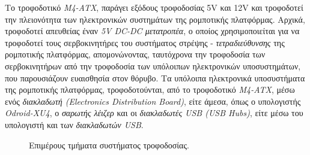 \bigskip
Το τροφοδοτικό \textit{M4-ATX}, παράγει εξόδους τροφοδοσίας 5V και 12V και τροφοδοτεί την πλειονότητα των ηλεκτρονικών συστημάτων της ρομποτικής πλατφόρμας. Αρχικά, τροφοδοτεί απευθείας έναν \textit{5V DC-DC μετατροπέα}, ο οποίος χρησιμοποιείται για να τροφοδοτεί τους σερβοκινητήρες του συστήματος στρέψης - \textit{τετραδιεύθυνσης} της ρομποτικής πλατφόρμας, απομονώνοντας, ταυτόχρονα την τροφοδοσία των σερβοκινητήρων από την τροφοδοσία των υπόλοιπων ηλεκτρονικών υποσυστημάτων, που παρουσιάζουν ευαισθησία στον θόρυβο. Τα υπόλοιπα ηλεκτρονικά υποσυστήματα της ρομποτικής πλατφόρμας, τροφοδοτούνται, από το τροφοδοτικό \textit{M4-ATX}, μέσω ενός \textit{διακλαδωτή (Electronics Distribution Board)}, είτε άμεσα, όπως ο υπολογιστής \textit{Odroid-XU4}, ο \textit{σαρωτής λέιζερ} και οι \textit{διακλαδωτές USB (USB Hubs)}, είτε μέσω του υπολογιστή και των \textit{διακλαδωτών USB}.

\begin{figure}[!ht]
	\centering
	\caption{Επιμέρους τμήματα συστήματος τροφοδοσίας.}
\end{figure}

